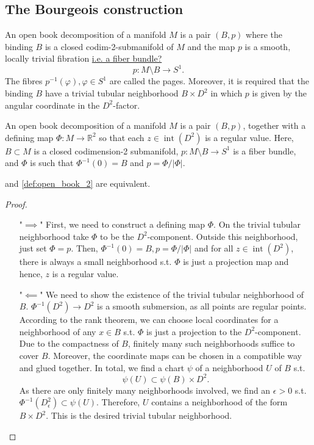 \subsection*{The Bourgeois construction}

\begin{definition}\label{def:open_book_1}
    An open book decomposition of a manifold $M$ is a pair $(B,p)$ where the binding $B$ is a closed codim-2-submanifold of $M$ and the map $p$ is a smooth, locally trivial fibration \underline{i.e. a fiber bundle?}
    \[
        p: M\setminus B \to S^1.
    \]
    The fibres $p^{-1}(\varphi), \varphi \in S^1$ are called the pages.
    Moreover, it is required that the binding $B$ have a trivial tubular neighborhood $B\times D^2$ in which $p$ is given by the angular coordinate in the $D^2$-factor.
\end{definition}

\begin{definition}\label{def:open_book_2}
    An open book decomposition of a manifold $M$ is a pair $(B, p)$, together with a defining map $\Phi:M \to \mathbb R^2$ so that each $z \in \operatorname{int}(D^2)$ is a regular value.
    Here, $B \subset M$ is a closed codimension-2 submanifold, $p: M\setminus B \to S^1$ is a fiber bundle, and $\Phi$ is such that $\Phi^{-1}(0) = B$ and $p =  \Phi / |\Phi|$.
\end{definition}

\begin{lemma}
     and \cref{def:open_book_2} are equivalent.
\end{lemma}
\begin{proof}
\ 
    \begin{itemize}
        \item["$\implies$"] First, we need to construct a defining map $\Phi$. On the trivial tubular neighborhood take $\Phi$ to be the $D^2$-component. Outside this neighborhood, just set $\Phi = p$.
        Then, $\Phi^{-1}(0) = B, p = \Phi/|\Phi|$ and for all $z \in \operatorname{int}(D^2)$, there is always a small neighborhood s.t. $\Phi$ is just a projection map and hence, $z$ is a regular value.
        \item["$\impliedby$"] We need to show the existence of the trivial tubular neighborhood of $B$.
        $\Phi^{-1}(D^2) \to D^2$ is a smooth submersion, as all points are regular points. 
        According to the rank theorem, we can choose local coordinates for a neighborhood of any $x \in B$ s.t. $\Phi$  is just a projection to the $D^2$-component. Due to the compactness of $B$, finitely many such neighborhoods suffice to cover $B$.
        Moreover, the coordinate maps can be chosen in a compatible way and glued together.
        In total, we find a chart $\psi$ of a neighborhood $U$ of $B$ s.t.
        \[
            \psi(U) \subset \psi(B) \times D^2.
        \]
        As there are only finitely many neighborhoods involved, we find an $\epsilon > 0$ s.t. $\Phi^{-1}(D_\epsilon^2) \subset \psi(U)$.
        Therefore, $U$ contains a neighborhood of the form $B \times D^2$.
        This is the desired trivial tubular neighborhood.
    \end{itemize}
\end{proof}

